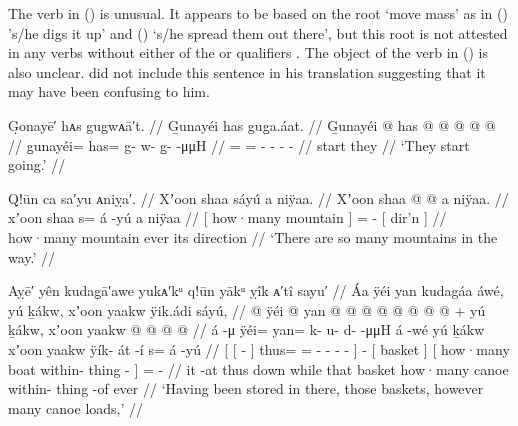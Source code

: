 The verb  in (\lastx) is unusual.
It appears to be based on the root  ‘move mass’ as in  () ’s/he digs it up’ and  () ‘s/he spread them out there’, but this root is not attested in any verbs without either of the  or  qualifiers \parencite[29–25]{leer:1976}.
The object of the verb in (\lastx) is also unclear.
\citeauthor{swanton:1909} did not include this sentence in his translation suggesting that it may have been confusing to him.

\ex\label{ex:92-159-started-going}%
%
\begingl
	\glpreamble	G̣onayē′ hᴀs gugwᴀā′t. //
	\glpreamble	G̱unayéi has gug̱a.áat. //
	\gla	G̱unayéi @ has @  @ {} @ {} @ {} @ {}  //
	\glb	g̱unayéi= has= g- w- g̱-  -μμH //
	\glc	{}= = - - -  - //
	\gld	start they  {} {} {} {} //
	\glft	‘They start going.’
		//
\endgl
\xe

\ex\label{ex:92-160-many-mountains-direction}%
%
\begingl
	\glpreamble	Q!ūn ca sa′yu ᴀniỵa′. //
	\glpreamble	Xʼoon shaa sáyú a niÿaa. //
	\gla	{} Xʼoon shaa {}  @ {} @ {}
		{} a niÿaa. {} //
	\glb	{} xʼoon shaa {} s= á -yú
		{} a niÿaa {}  //
	\glc	{}[ how·many mountain {}] =  -
		{}[  dir’n {}] //
	\gld	{} how·many mountain {} ever\·  {}
		{} its direction {} //
	\glft	‘There are so many mountains in the way.’
		//
\endgl
\xe

\ex\label{ex:92-161-stored-baskets-canoeloads}%
%
\begingl
	\glpreamble	Aỵē′ yên kudag̣ā′awe yukᴀ′kᵘ q!ūn yākᵘ ỵîk ᴀ′tî sayu′ //
	\glpreamble	Áa ÿéi yan kudagáa áwé, yú ḵákw, xʼoon yaakw ÿik.ádi sáyú, //
	\gla	{} {}  @ {} {}
			ÿéi @ yan @  @ {} @ {} @ {} @ {} @ {} @ {} {}
		 @ {} +
		{} yú ḵákw, {}
		{} xʼoon yaakw  @ {} @ {} {}
		 @ {} @ {} //
	\glb	{} {} á -μ {} ÿéi= yan= k- u- {} d-  -μμH {} {}
		á -wé
		{} yú ḵákw {}
		{} xʼoon yaakw ÿík- át -í {}
		s= á -yú //
	\glc	{}[ {}[  - {}]
			thus= = - - \· -
				 - \· {}]
		 -
		{}[  basket {}]
		{}[ how·many boat within- thing - {}]
		=  - //
	\gld	{} {} it -at {} thus down
			 {} {} {} {} {} while {}
		 {}
		{} that basket {}
		{} how·many canoe within- thing -of {}
		ever\·  {} //
	\glft	‘Having been stored in there, those baskets, however many canoe loads,’
		//
\endgl
\xe

